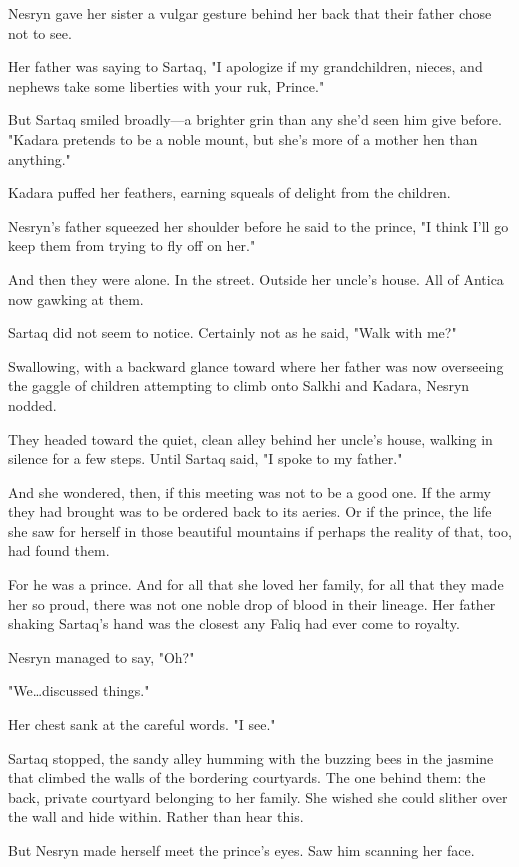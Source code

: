 Nesryn gave her sister a vulgar gesture behind her back that their father chose not to see.

Her father was saying to Sartaq, "I apologize if my grandchildren, nieces, and nephews take some liberties with your ruk, Prince."

But Sartaq smiled broadly---a brighter grin than any she'd seen him give before.
"Kadara pretends to be a noble mount, but she's more of a mother hen than anything."

Kadara puffed her feathers, earning squeals of delight from the children.

Nesryn's father squeezed her shoulder before he said to the prince, "I think I'll go keep them from trying to fly off on her."

And then they were alone.
In the street.
Outside her uncle's house.
All of Antica now gawking at them.

Sartaq did not seem to notice.
Certainly not as he said, "Walk with me?"

Swallowing, with a backward glance toward where her father was now overseeing the gaggle of children attempting to climb onto Salkhi and Kadara, Nesryn nodded.

They headed toward the quiet, clean alley behind her uncle's house, walking in silence for a few steps.
Until Sartaq said, "I spoke to my father."

And she wondered, then, if this meeting was not to be a good one.
If the army they had brought was to be ordered back to its aeries.
Or if the prince, the life she saw for herself in those beautiful mountains  if perhaps the reality of that, too, had found them.

For he was a prince.
And for all that she loved her family, for all that they made her so proud, there was not one noble drop of blood in their lineage.
Her father shaking Sartaq's hand was the closest any Faliq had ever come to royalty.

Nesryn managed to say, "Oh?"

"We\ldots discussed things."

Her chest sank at the careful words.
"I see."

Sartaq stopped, the sandy alley humming with the buzzing bees in the jasmine that climbed the walls of the bordering courtyards.
The one behind them: the back, private courtyard belonging to her family.
She wished she could slither over the wall and hide within.
Rather than hear this.

But Nesryn made herself meet the prince's eyes.
Saw him scanning her face.

